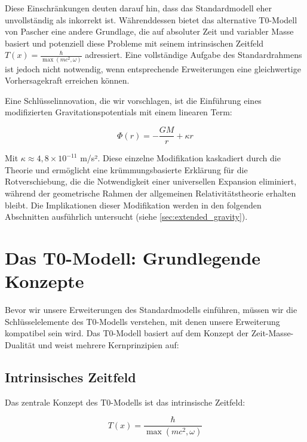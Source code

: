 \documentclass[12pt,a4paper]{article}
\newcommand{\Tfield}{T(x)}
\begin{document}
	Diese Einschränkungen deuten darauf hin, dass das Standardmodell eher unvollständig als inkorrekt ist. Währenddessen bietet das alternative T0-Modell von Pascher eine andere Grundlage, die auf absoluter Zeit und variabler Masse basiert\cite{pascher_zeit_2025} und potenziell diese Probleme mit seinem intrinsischen Zeitfeld $\Tfield = \frac{\hbar}{\max(mc^2, \omega)}$ adressiert\cite{pascher_lagrange_2025}. Eine vollständige Aufgabe des Standardrahmens ist jedoch nicht notwendig, wenn entsprechende Erweiterungen eine gleichwertige Vorhersagekraft erreichen können.
	
	Eine Schlüsselinnovation, die wir vorschlagen, ist die Einführung eines modifizierten Gravitationspotentials mit einem linearen Term:
	
	\begin{equation}
		\label{eq:modified_potential}
		\Phi(r) = -\frac{GM}{r} + \kappa r
	\end{equation}
	
	Mit $\kappa \approx 4,8\times10^{-11}$ m/s²\cite{pascher_params_2025}. Diese einzelne Modifikation kaskadiert durch die Theorie und ermöglicht eine krümmungsbasierte Erklärung für die Rotverschiebung, die die Notwendigkeit einer universellen Expansion eliminiert, während der geometrische Rahmen der allgemeinen Relativitätstheorie erhalten bleibt. Die Implikationen dieser Modifikation werden in den folgenden Abschnitten ausführlich untersucht (siehe \cref{sec:extended_gravity}).
	
	\section{Das T0-Modell: Grundlegende Konzepte}
	\label{sec:t0_model_fundamentals}
	
	Bevor wir unsere Erweiterungen des Standardmodells einführen, müssen wir die Schlüsselelemente des T0-Modells verstehen, mit denen unsere Erweiterung kompatibel sein wird. Das T0-Modell basiert auf dem Konzept der Zeit-Masse-Dualität\cite{pascher_zeit_masse_2025} und weist mehrere Kernprinzipien auf:
	
	\subsection{Intrinsisches Zeitfeld}
	\label{subsec:intrinsic_time}
	
	Das zentrale Konzept des T0-Modells ist das intrinsische Zeitfeld:
	
	\begin{equation}
		\label{eq:intrinsic_time}
		\Tfield = \frac{\hbar}{\max(mc^2, \omega)}
	\end{equation}
	
\end{document}
